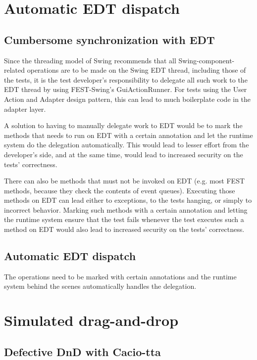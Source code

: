 \section{Automatic EDT dispatch}\label{sec:edt-dispatch}

\subsection{Cumbersome synchronization with EDT}\label{sec:edt-sync}

Since the threading model of Swing recommends that all Swing-component-related operations are to be made on the Swing EDT thread, including those of the tests, it is the test developer's responsibility to delegate all such work to the EDT thread by using FEST-Swing's GuiActionRunner. For tests using the User Action and Adapter design pattern, this can lead to much boilerplate code in the adapter layer. 

A solution to having to manually delegate work to EDT would be to mark the methods that needs to run on EDT with a certain annotation and let the runtime system do the delegation automatically. This would lead to lesser effort from the developer's side, and at the same time, would lead to increased security on the tests' correctness.

There can also be methods that must not be invoked on EDT (e.g. most FEST methods, because they check the contents of event queues). Executing those methods on EDT can lead either to exceptions, to the tests hanging, or simply to incorrect behavior. Marking such methods with a certain annotation and letting the runtime system ensure that the test fails whenever the test executes such a method on EDT would also lead to increased security on the tests' correctness.

\subsection {Automatic EDT dispatch}\label{sec:edt-dispatch}

The operations need to be marked with certain annotations and the runtime system behind the scenes automatically handles the delegation.

\section {Simulated drag-and-drop}\label{sec:simulated-dnd}

\subsection{Defective DnD with Cacio-tta}\label{sec:defective-dnd}


